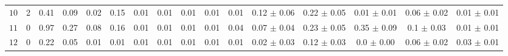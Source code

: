 \begin{tabular}{l|cc|cccccccc|ccccc}
 $10$  & 2 & 0.41 & 0.09 & 0.02 & 0.15 & 0.01 & 0.01 & 0.01 & 0.01 & 0.01 & 0.12 $\pm$ 0.06 & 0.22 $\pm$ 0.05 & 0.01 $\pm$ 0.01 & 0.06 $\pm$ 0.02 & 0.01 $\pm$ 0.01 \\ 
 $11$  & 0 & 0.97 & 0.27 & 0.08 & 0.16 & 0.01 & 0.01 & 0.01 & 0.01 & 0.04 & 0.07 $\pm$ 0.04 & 0.23 $\pm$ 0.05 & 0.35 $\pm$ 0.09 & 0.1 $\pm$ 0.03 & 0.01 $\pm$ 0.01 \\ 
 $12$  & 0 & 0.22 & 0.05 & 0.01 & 0.01 & 0.01 & 0.01 & 0.01 & 0.01 & 0.01 & 0.02 $\pm$ 0.03 & 0.12 $\pm$ 0.03 & 0.0 $\pm$ 0.00 & 0.06 $\pm$ 0.02 & 0.03 $\pm$ 0.01 \\ 
\end{tabular} 
